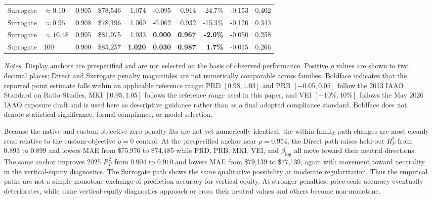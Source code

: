 \documentclass[10pt]{article}
\theoremstyle{definition}
\newcommand{\1}{\mathbf{1}}
\newcommand{\oldtext}[1]{\textcolor{blue}{\sout{#1}}}
\newcommand{\newtext}[1]{\textcolor{impGreen}{#1}}
\begin{document}
\begin{table}[!htbp]
{\begin{tabular}{llrrrrrrrr}
Surrogate
& $\approx 0.10$
& 0.905
& \$78,546
& 1.074
& -0.095
& 0.914
& -24.7\%
& -0.153
& 0.402 \\

Surrogate
& $\approx 0.95$
& 0.908
& \$78,196
& 1.060
& -0.062
& 0.932
& -15.3\%
& -0.120
& 0.343 \\

Surrogate
& $\approx 10.48$
& 0.905
& \$81,075
& 1.033
& \textbf{0.000}
& \textbf{0.967}
& \textbf{-2.0\%}
& -0.050
& 0.258 \\

Surrogate
& 100
& 0.900
& \$85,257
& \textbf{1.020}
& \textbf{0.030}
& \textbf{0.987}
& \textbf{1.7\%}
& -0.015
& 0.266 \\

\bottomrule
\end{tabular}
}

\vspace{1mm}
\begin{minipage}{\textwidth}
\scriptsize
\emph{Notes.}
Display anchors are prespecified and are not selected on the basis of observed
performance. Positive $\rho$ values are shown to two decimal places; Direct and
Surrogate penalty magnitudes are not numerically comparable across families.
Boldface indicates that the reported point estimate falls within an applicable
reference range: PRD $[0.98,1.03]$ and PRB $[-0.05,0.05]$ follow the
2013 IAAO Standard on Ratio Studies, MKI $[0.95,1.05]$ follows the reference
range used in this paper, and VEI $[-10\%,10\%]$ follows the May 2026 IAAO
exposure draft and is used here as descriptive guidance rather than as a final
adopted compliance standard. Boldface does not denote statistical significance,
formal compliance, or model selection.
\end{minipage}

\end{table}

Because the native and custom-objective zero-penalty fits are not yet numerically
identical, the within-family path changes are most cleanly read relative to the
custom-objective $\rho=0$ control. At the prespecified anchor near
$\rho=0.954$, the Direct path raises held-out $R^2_P$ from $0.893$ to $0.899$
and lowers MAE from \$75,976 to \$74,485 while PRD, PRB, MKI, VEI, and
$\beta_{\log}$ all move toward their neutral directions. The same anchor improves
2025 $R^2_P$ from $0.904$ to $0.910$ and lowers MAE from \$79,139 to
\$77,139, again with movement toward neutrality in the vertical-equity
diagnostics. The Surrogate path shows the same qualitative possibility at moderate
regularization. 
\newtext{Thus the empirical paths are not a simple monotone exchange of prediction accuracy for vertical equity. At stronger penalties, price-scale accuracy eventually deteriorates, while some vertical-equity diagnostics approach or cross their neutral values and others become non-monotone.}
\end{document}
